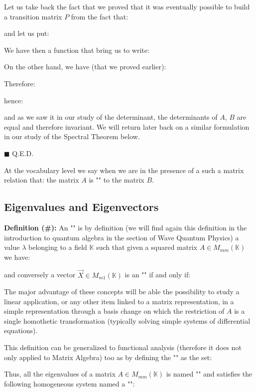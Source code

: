 	\begin{dem}
	Let us take back the fact that we proved that it was eventually possible to build a transition matrix $P$ from the fact that:
	
	and let us put:
	
	We have then a function that bring us to write:
	
	On the other hand, we have (that we proved earlier):
	
	Therefore:
	
	hence:
	
	and as we saw it in our study of the determinant, the determinants of $A$, $B$ are equal and therefore invariant. We will  return later back on a similar formulation in our study of the Spectral Theorem below.
	\begin{flushright}
		$\blacksquare$  Q.E.D.
	\end{flushright}
	\end{dem}
	At the vocabulary level we say when we are in the presence of a such a matrix relation that: the matrix $A$ is "" to the matrix $B$.
	
	\pagebreak
	\subsection{Eigenvalues and Eigenvectors}\label{eigenvector}
	\textbf{Definition (\#\mydef):} An "" is by definition (we will find again this definition in the introduction to quantum algebra in the section of Wave Quantum Physics) a value $\lambda$ belonging to a field $\mathbb{K}$ such that given a squared matrix $A\in M_{mm}(\mathbb{K})$ we have:
	
	and conversely a vector $\vec{X}\in M_{m1}(\mathbb{K})$ is an "" if and only if:
	
	The major advantage of these concepts will be able the possibility to study a linear application, or any other item linked to a matrix representation, in a simple representation through a basis change on which the restriction of $A$ is a single homothetic transformation (typically solving simple systems of differential equations). 
	\begin{tcolorbox}[title=Remark,colframe=black,arc=10pt]
	This definition can be generalized to functional analysis (therefore it does not only applied to Matrix Algebra) too as by defining the "\label{spectrum of an endomorphism}" as the set:
	
	\end{tcolorbox}
	Thus, all the eigenvalues of a matrix $A\in M_{mm}(\mathbb{K})$ is named "" and satisfies the following homogeneous system named a "\label{matrix-eigenvalue equation}":
	
